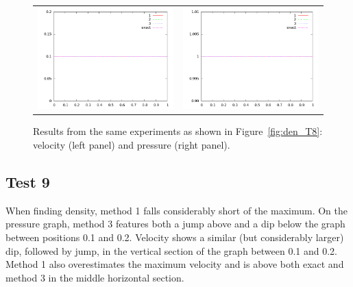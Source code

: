\documentclass[10pt]{article}
\begin{document}
\begin{figure}
  \begin{center}
	\begin{tabular}{cc}
      \includegraphics[width=.425\textwidth]{vel_T8.png} &
	  \includegraphics[width=.425\textwidth]{prs_T8.png}
	\end{tabular}
  \end{center}
  \caption{Results from the same experiments as shown in Figure~\ref{fig:den_T8}:
  velocity (left panel) and pressure (right panel).}
\end{figure}

\clearpage

\subsection{Test 9}
When finding density, method 1 falls considerably short of the maximum. On the pressure graph, method 3 features both a jump above and a dip below the graph between positions 0.1 and 0.2. Velocity shows a similar (but considerably larger) dip, followed by jump, in the vertical section of the graph between 0.1 and 0.2. Method 1 also overestimates the maximum velocity and is above both exact and method 3 in the middle horizontal section. 
\end{document}
